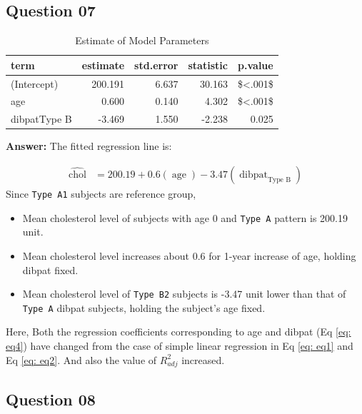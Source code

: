 \documentclass[
  12pt,
  oneside]{article}
\providecommand{\tightlist}{%
  \setlength{\itemsep}{0pt}\setlength{\parskip}{0pt}}
\begin{document}
\hypertarget{question-07}{%
\subsection{Question 07}\label{question-07}}

\begin{table}[H]

\caption{\label{tab:Table-09}Estimate of Model Parameters}
\centering
\begin{tabular}[t]{lrrrr}
\toprule
term & estimate & std.error & statistic & p.value\\
\midrule
(Intercept) & 200.191 & 6.637 & 30.163 & \$<.001\$\\
age & 0.600 & 0.140 & 4.302 & \$<.001\$\\
dibpatType B & -3.469 & 1.550 & -2.238 & 0.025\\
\bottomrule
\end{tabular}
\end{table}

\textbf{Answer:} The fitted regression line is:

\begin{equation}
\label{eq: eq4}
\begin{aligned}
\operatorname{\widehat{chol}} &= 200.19 + 0.6(\operatorname{age}) - 3.47(\operatorname{dibpat}_{\operatorname{Type\ B}})
\end{aligned}
\end{equation}
Since \texttt{Type\ A1} subjects are reference group,

\begin{itemize}
\tightlist
\item
  Mean cholesterol level of subjects with age 0 and \texttt{Type\ A} pattern is 200.19 unit.
\item
  Mean cholesterol level increases about 0.6 for 1-year increase of age, holding dibpat fixed.
\item
  Mean cholesterol level of \texttt{Type\ B2} subjects is -3.47 unit lower than that of \texttt{Type\ A} dibpat subjects, holding the subject's age fixed.
\end{itemize}

Here, Both the regression coefficients corresponding to age and dibpat (Eq \ref{eq: eq4}) have changed from the case of simple linear regression in Eq \ref{eq: eq1} and Eq \ref{eq: eq2}. And also the value of \(R^2_{adj}\) increased.

\hypertarget{question-08}{%
\subsection{Question 08}\label{question-08}}
\end{document}
